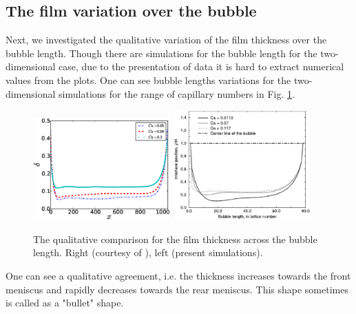 \documentclass{article}
\begin{document}
\subsection{The film variation over the bubble}

Next, we investigated the qualitative variation of the film thickness over the bubble length.
Though there are simulations for the bubble length for the two-dimensional case, due to
the presentation of data it is hard to extract numerical values from the plots. One can see bubble lengths
variations for the two-dimensional simulations for the range of capillary numbers in Fig.
\ref{fig:sehgal:bubble:length}.
\begin{figure}
\includegraphics[width=0.47\textwidth]{Figures/Bubble/bubble_length.eps}\hfill
\includegraphics[width=0.47\textwidth]{Figures/Bubble/bubble_sehgal.eps}\\
\caption{The qualitative comparison for the film thickness across
the bubble length. Right (courtesy of \citet{sehgal-microchannel}),
left (present simulations).\label{fig:sehgal:bubble:length}}
\end{figure}
One can see a qualitative agreement, i.e. the thickness increases towards the front meniscus and
rapidly decreases towards the rear meniscus. This shape sometimes is called as a "bullet" shape.
\end{document}
